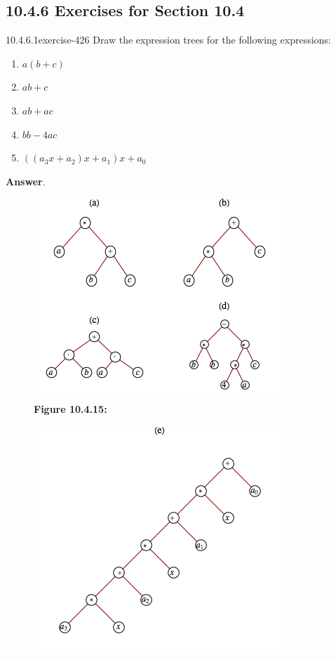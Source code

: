 \documentclass[twoside,10pt,]{book}
\numberwithin{equation}{section}
\begin{document}
\subsection*{10.4.6 Exercises for Section 10.4}
\begin{divisionsolution}{10.4.6.1}{}{exercise-426}%
\hypertarget{p-3736}{}%
Draw the expression trees for the following expressions:%
\par
\hypertarget{p-3737}{}%
\leavevmode%
\begin{enumerate}[label=(\alph*)]
\item\hypertarget{li-1719}{}\hypertarget{p-3738}{}%
\(a(b + c)\)%
\item\hypertarget{li-1720}{}\hypertarget{p-3739}{}%
\(a b + c\)%
\item\hypertarget{li-1721}{}\hypertarget{p-3740}{}%
\(a b + a c\)%
\item\hypertarget{li-1722}{}\hypertarget{p-3741}{}%
\(b b - 4 a c\)%
\item\hypertarget{li-1723}{}\hypertarget{p-3742}{}%
\(\left(\left(a_3 x + a_2\right)x +a_1\right)x + a_0\)%
\end{enumerate}
%
\par\smallskip%
\noindent\textbf{Answer}.\quad%
\leavevmode%
\begin{figure}
\centering
\includegraphics[width=0.8\linewidth]{images/fig-sol-10-4-1-A.png}
\caption*{\textbf{Figure 10.4.15:} }
\end{figure}
\begin{figure}
\centering
\includegraphics[width=0.7\linewidth]{images/fig-sol-10-4-1-B.png}

\end{figure}
\end{divisionsolution}
\end{document}

